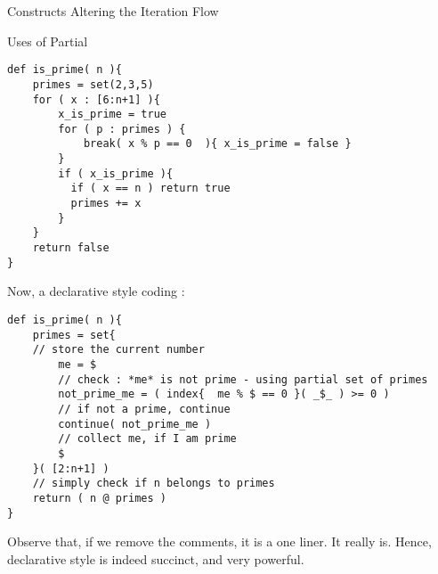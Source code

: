 \begin{section}{Constructs Altering the Iteration Flow}
\begin{subsection}{Uses of Partial}
\begin{lstlisting}[style=JexlStyle]
def is_prime( n ){
    primes = set(2,3,5)
    for ( x : [6:n+1] ){
        x_is_prime = true 
        for ( p : primes ) {
            break( x % p == 0  ){ x_is_prime = false }
        }
        if ( x_is_prime ){
          if ( x == n ) return true 
          primes += x 
        }
    }
    return false 
}
\end{lstlisting}
Now, a declarative style coding :
\begin{lstlisting}[style=JexlStyle]
def is_prime( n ){
    primes = set{
    // store the current number
        me = $
        // check : *me* is not prime - using partial set of primes
        not_prime_me = ( index{  me % $ == 0 }( _$_ ) >= 0 ) 
        // if not a prime, continue 
        continue( not_prime_me )
        // collect me, if I am prime 
        $   
    }( [2:n+1] )
    // simply check if n belongs to primes
    return ( n @ primes )  
}
\end{lstlisting}
Observe that, if we remove the comments, it is a one liner. 
It really is. Hence, declarative style is indeed succinct, and very powerful.

\end{subsection}

\end{section}



